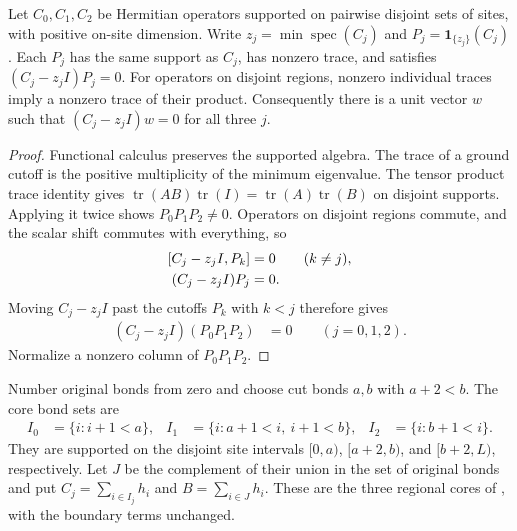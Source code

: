 \begin{lemma}
    \label{lem:aklv_disjoint_regional_ground}
    \leanok
    Let $C_0,C_1,C_2$ be Hermitian operators supported on pairwise
    disjoint sets of sites, with positive on-site dimension. Write
    $z_j=\min\operatorname{spec}(C_j)$ and
    $P_j=\mathbf{1}_{\{z_j\}}(C_j)$. Each $P_j$ has the same support
    as $C_j$, has nonzero trace, and satisfies $(C_j-z_jI)P_j=0$.
    For operators on disjoint regions, nonzero individual traces imply
    a nonzero trace of their product. Consequently there is a unit vector
    $w$ such that $(C_j-z_jI)w=0$ for all three $j$.
\end{lemma}
\begin{proof}
    \leanok
    Functional calculus preserves the supported algebra. The trace of a
    ground cutoff is the positive multiplicity of the minimum eigenvalue.
    The tensor product trace identity gives
    $\operatorname{tr}(AB)\operatorname{tr}(I)
        =\operatorname{tr}(A)\operatorname{tr}(B)$ on disjoint supports.
    Applying it twice shows $P_0P_1P_2\ne0$. Operators on disjoint regions
    commute, and the scalar shift commutes with everything, so
    \begin{align}
        \lbrack C_j-z_jI,P_k\rbrack & =0\qquad(k\ne j),\notag \\
        (C_j-z_jI)P_j               & =0.
    \end{align}
    Moving $C_j-z_jI$ past the cutoffs $P_k$ with $k<j$ therefore gives
    \begin{align}
        (C_j-z_jI)(P_0P_1P_2) & =0\qquad(j=0,1,2).
    \end{align}
    Normalize a nonzero column of $P_0P_1P_2$.
\end{proof}

\begin{definition}
    \label{def:aklv_original_normalization_cores}
    \leanok
    Number original bonds from zero and choose cut bonds $a,b$ with
    $a+2<b$. The core bond sets are
    \begin{align}
        I_0 & =\{i:i+1<a\},         &
        I_1 & =\{i:a+1<i,\ i+1<b\}, &
        I_2 & =\{i:b+1<i\}.
    \end{align}
    They are supported on the disjoint site intervals
    $\lbrack 0,a)$, $\lbrack a+2,b)$, and $\lbrack b+2,L)$, respectively. Let $J$ be the
    complement of their union in the set of original bonds and put
    $C_j=\sum_{i\in I_j}h_i$ and $B=\sum_{i\in J}h_i$.
    These are the three regional cores of
    \cite[Section~6.1]{Arad2013AreaLaw}, with the boundary terms unchanged.
\end{definition}

